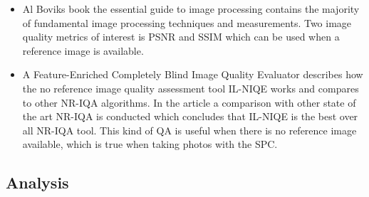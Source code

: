 \begin{itemize}

    \item Al Boviks book the essential guide to image processing \cite{book:image_processing} contains the majority of fundamental image processing techniques and measurements. Two image quality metrics of interest is PSNR and SSIM which can be used when a reference image is available.
    
    \item \cite{article:il_niqe} A Feature-Enriched Completely Blind Image
    Quality Evaluator describes how the no reference image quality assessment tool IL-NIQE works and compares to other NR-IQA algorithms. In the article a comparison with other state of the art NR-IQA is conducted which concludes that IL-NIQE is the best over all NR-IQA tool. This kind of QA is useful when there is no reference image available, which is true when taking photos with the SPC.
    
    
    
\end{itemize}


\subsection{Analysis}
